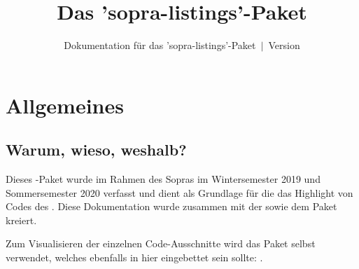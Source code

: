 \documentclass{sopra-base}
\title{Das 'sopra-listings'-Paket}
\subtitle[Dokumentation für das 'sopra-listings'-Paket]{Dokumentation für das 'sopra-listings'-Paket~$\mid$~Version \thesolversion}
\begin{document}
    \maketitle%
%
%

%
%
%
%

\section{Allgemeines}
\subsection{Warum, wieso, weshalb?}
    Dieses \LaTeXe-Paket wurde im Rahmen des Sopras im 
    Wintersemester 2019 und Sommersemester 2020 verfasst und dient als
    Grundlage für die das Highlight von Codes
    des . Diese Dokumentation wurde zusammen mit der 
     sowie dem Paket  kreiert.\par
    Zum Visualisieren der einzelnen Code-Ausschnitte wird das Paket selbst verwendet, welches ebenfalls in hier eingebettet sein sollte: . 
\end{document}

